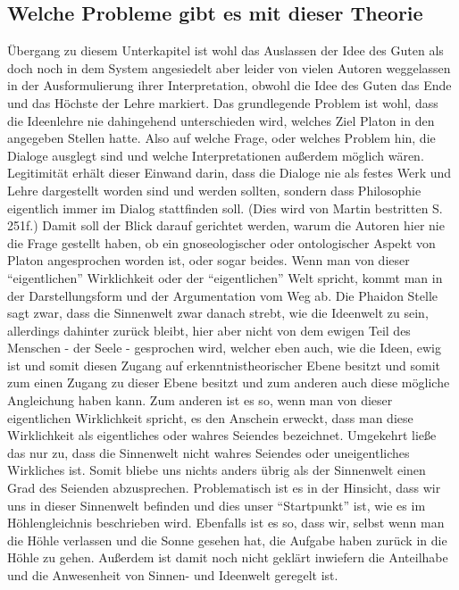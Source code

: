 \subsection{Welche Probleme gibt es mit dieser Theorie}
Übergang zu diesem Unterkapitel ist wohl das Auslassen der Idee des Guten als doch noch in dem System angesiedelt aber leider von vielen Autoren weggelassen in der Ausformulierung ihrer Interpretation, obwohl die Idee des Guten das Ende und das Höchste der Lehre markiert.
Das grundlegende Problem ist wohl, dass die Ideenlehre nie dahingehend unterschieden wird, welches Ziel Platon in den angegeben Stellen hatte. Also auf welche Frage, oder welches Problem hin, die Dialoge ausglegt sind und welche Interpretationen außerdem möglich wären. Legitimität erhält dieser Einwand darin, dass die Dialoge nie als festes Werk und Lehre dargestellt worden sind und werden sollten, sondern dass Philosophie eigentlich immer im Dialog stattfinden soll. (Dies wird von Martin bestritten S. 251f.) Damit soll der Blick darauf gerichtet werden, warum die Autoren hier nie die Frage gestellt haben, ob ein gnoseologischer oder ontologischer Aspekt von Platon angesprochen worden ist, oder sogar beides.  
Wenn man von dieser \enquote{eigentlichen} Wirklichkeit oder der \enquote{eigentlichen} Welt spricht, kommt man in der Darstellungsform und der Argumentation vom Weg ab. Die Phaidon Stelle sagt zwar, dass die Sinnenwelt zwar danach strebt, wie die Ideenwelt zu sein, allerdings dahinter zurück bleibt, hier aber nicht von dem ewigen Teil des Menschen - der Seele - gesprochen wird, welcher eben auch, wie die Ideen, ewig ist und somit diesen Zugang auf erkenntnistheorischer Ebene besitzt und somit zum einen Zugang zu dieser Ebene besitzt und zum anderen auch diese mögliche Angleichung haben kann. 
Zum anderen ist es so, wenn man von dieser eigentlichen Wirklichkeit spricht, es den Anschein erweckt, dass man diese Wirklichkeit als eigentliches oder wahres Seiendes bezeichnet. Umgekehrt ließe das nur zu, dass die Sinnenwelt nicht wahres Seiendes oder uneigentliches Wirkliches ist. Somit bliebe uns nichts anders übrig als der Sinnenwelt einen Grad des Seienden abzusprechen. Problematisch ist es in der Hinsicht, dass wir uns in dieser Sinnenwelt befinden und dies unser \enquote{Startpunkt} ist, wie es im Höhlengleichnis beschrieben wird. Ebenfalls ist es so, dass wir, selbst wenn man die Höhle verlassen und die Sonne gesehen hat, die Aufgabe haben zurück in die Höhle zu gehen.
Außerdem ist damit noch nicht geklärt inwiefern die Anteilhabe und die Anwesenheit von Sinnen- und Ideenwelt geregelt ist.
